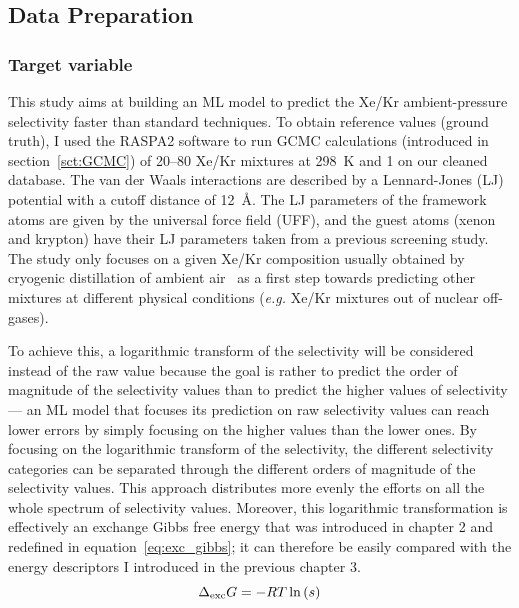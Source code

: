 \documentclass[main]{subfiles}
\begin{document}
\subsection{Data Preparation}


\subsubsection{Target variable}

This study aims at building an ML model to predict the Xe/Kr ambient-pressure selectivity faster than standard techniques. To obtain reference values (ground truth), I used the RASPA2 software\autocite{dubbeldam2016} to run GCMC calculations (introduced in section~\ref{sct:GCMC}) of 20–80 Xe/Kr mixtures at \SI{298}{\kelvin} and \SI{1}{\atm} on our cleaned database. The van der Waals interactions are described by a Lennard-Jones (LJ) potential with a cutoff distance of \SI{12}{\angstrom}. The LJ parameters of the framework atoms are given by the universal force field (UFF),\autocite{rappe1992} and the guest atoms (xenon and krypton) have their LJ parameters taken from a previous screening study.\autocite{Ryan_2010} The study only focuses on a given Xe/Kr composition usually obtained by cryogenic distillation of ambient air~\autocite{kerry2007industrial} as a first step towards predicting other mixtures at different physical conditions (\emph{e.g.} Xe/Kr mixtures out of nuclear off-gases). 

To achieve this, a logarithmic transform of the selectivity will be considered instead of the raw value because the goal is rather to predict the order of magnitude of the selectivity values than to predict the higher values of selectivity --- an ML model that focuses its prediction on raw selectivity values can reach lower errors by simply focusing on the higher values than the lower ones. By focusing on the logarithmic transform of the selectivity, the different selectivity categories can be separated through the different orders of magnitude of the selectivity values. This approach distributes more evenly the efforts on all the whole spectrum of selectivity values. Moreover, this logarithmic transformation is effectively an exchange Gibbs free energy that was introduced in chapter 2 and redefined in equation~\ref{eq:exc_gibbs}; it can therefore be easily compared with the energy descriptors I introduced in the previous chapter 3.
\begin{equation}\label{eq:exc_gibbs}
  \Delta_{\text{exc}}G = -RT \ln\left(s\right)
\end{equation}
\end{document}
